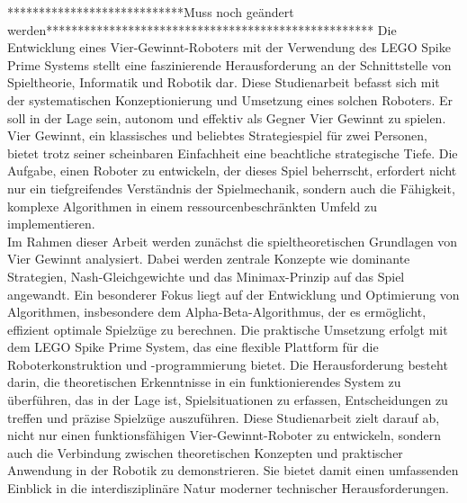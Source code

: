 ****************************Muss noch geändert werden****************************************************
Die Entwicklung eines Vier-Gewinnt-Roboters mit der Verwendung des LEGO Spike Prime Systems stellt eine faszinierende Herausforderung an der Schnittstelle von Spieltheorie, Informatik und Robotik dar. Diese Studienarbeit befasst sich mit der systematischen Konzeptionierung und Umsetzung eines solchen Roboters. Er soll in der Lage sein, autonom und effektiv als Gegner Vier Gewinnt zu spielen.\\
Vier Gewinnt, ein klassisches und beliebtes Strategiespiel für zwei Personen, bietet trotz seiner scheinbaren Einfachheit eine beachtliche strategische Tiefe.
Die Aufgabe, einen Roboter zu entwickeln, der dieses Spiel beherrscht, erfordert nicht nur ein tiefgreifendes Verständnis der Spielmechanik, sondern auch die Fähigkeit, komplexe Algorithmen in einem ressourcenbeschränkten Umfeld zu implementieren.\\

Im Rahmen dieser Arbeit werden zunächst die spieltheoretischen Grundlagen von Vier Gewinnt analysiert. Dabei werden zentrale Konzepte wie dominante Strategien, Nash-Gleichgewichte und das Minimax-Prinzip auf das Spiel angewandt. Ein besonderer Fokus liegt auf der Entwicklung und Optimierung von Algorithmen, insbesondere dem Alpha-Beta-Algorithmus, der es ermöglicht, effizient optimale Spielzüge zu berechnen.
Die praktische Umsetzung erfolgt mit dem LEGO Spike Prime System, das eine flexible Plattform für die Roboterkonstruktion und -programmierung bietet. Die Herausforderung besteht darin, die theoretischen Erkenntnisse in ein funktionierendes System zu überführen, das in der Lage ist, Spielsituationen zu erfassen, Entscheidungen zu treffen und präzise Spielzüge auszuführen.
Diese Studienarbeit zielt darauf ab, nicht nur einen funktionsfähigen Vier-Gewinnt-Roboter zu entwickeln, sondern auch die Verbindung zwischen theoretischen Konzepten und praktischer Anwendung in der Robotik zu demonstrieren. Sie bietet damit einen umfassenden Einblick in die interdisziplinäre Natur moderner technischer Herausforderungen.






